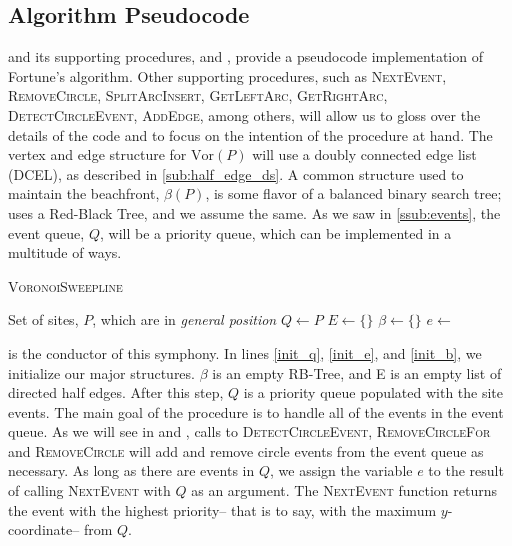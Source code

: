 \documentclass[12pt,twoside]{reedthesis}
\begin{document}
  \subsection{Algorithm Pseudocode} %
  \label{sub:sweep_algorithm_pseudocode}
     and its supporting procedures,  and , provide a pseudocode implementation of Fortune's algorithm. Other supporting procedures, such as \textsc{NextEvent, RemoveCircle, SplitArcInsert, GetLeftArc, GetRightArc, DetectCircleEvent, AddEdge}, among others, will allow us to gloss over the details of the code and to focus on the intention of the procedure at hand. The vertex and edge structure for $\mbox{Vor}(P)$ will use a doubly connected edge list (DCEL), as described in \cref{sub:half_edge_ds}. A common structure used to maintain the beachfront, $\beta(P)$, is some flavor of a balanced binary search tree; \citealp{deberg} uses a Red-Black Tree, and we assume the same. As we saw in \cref{ssub:events}, the event queue, $Q$, will be a priority queue, which can be implemented in a multitude of ways.\par
    
    \begin{algorithm}[H]
    \caption{\textsc{VoronoiSweepline}}\label{VoronoiSweepline}
    \begin{algorithmic}[1]
    \Require Set of sites, $P$, which are in \emph{general position}
    \State $Q\gets P$ \label{init_q} 
    \State $E\gets \{\}$ \label{init_e} 
    \State $\beta\gets \{\}$ \label{init_b}
     \label{vs_while}
      \State $e\gets$ 
        \State{}
      \Else
        \State{}
      \EndIf
    \EndWhile \label{vs_while_end}
    \EndProcedure
    \end{algorithmic} 
    \end{algorithm}

     is the conductor of this symphony. In lines \ref{init_q}, \ref{init_e}, and \ref{init_b}, we initialize our major structures. $\beta$ is an empty RB-Tree, and E is an empty list of directed half edges. After this step, $Q$ is a priority queue populated with the site events. The main goal of the  procedure is to handle all of the events in the event queue. As we will see in  and , calls to \textsc{DetectCircleEvent, RemoveCircleFor} and \textsc{RemoveCircle} will add and remove circle events from the event queue as necessary. As long as there are events in $Q$, we assign the variable $e$ to the result of calling \textsc{NextEvent} with $Q$ as an argument. The \textsc{NextEvent} function returns the event with the highest priority-- that is to say, with the maximum $y$-coordinate-- from $Q$.\par
\end{document}
